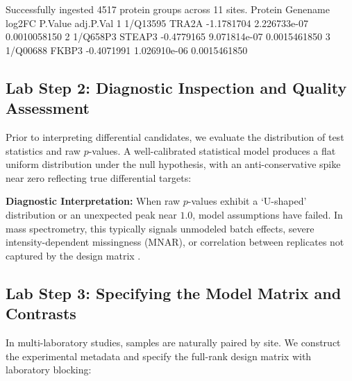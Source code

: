 \documentclass[11pt,twoside,openright]{book}
\begin{document}
\begin{routput}
Successfully ingested 4517 protein groups across 11 sites.
   Protein Genename     log2FC      P.Value    adj.P.Val
1 1/Q13595    TRA2A -1.1781704 2.226733e-07 0.0010058150
2 1/Q658P3   STEAP3 -0.4779165 9.071814e-07 0.0015461850
3 1/Q00688    FKBP3 -0.4071991 1.026910e-06 0.0015461850
\end{routput}

\subsection{Lab Step 2: Diagnostic Inspection and Quality Assessment}

Prior to interpreting differential candidates, we evaluate the distribution of test statistics and raw $p$-values. A well-calibrated statistical model produces a flat uniform distribution under the null hypothesis, with an anti-conservative spike near zero reflecting true differential targets:


\begin{notebox}
\textbf{Diagnostic Interpretation:} When raw $p$-values exhibit a `U-shaped' distribution or an unexpected peak near $1.0$, model assumptions have failed. In mass spectrometry, this typically signals unmodeled batch effects, severe intensity-dependent missingness (MNAR), or correlation between replicates not captured by the design matrix \cite{karpievitch2012statistical, lazar2016accounting}.
\end{notebox}

\subsection{Lab Step 3: Specifying the Model Matrix and Contrasts}

In multi-laboratory studies, samples are naturally paired by site. We construct the experimental metadata and specify the full-rank design matrix with laboratory blocking:
\end{document}
